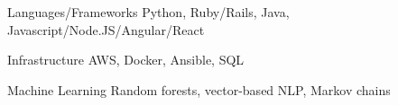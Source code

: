 

\begin{cvskills}
  \cvskill
    {Languages/Frameworks}
    {Python, Ruby/Rails, Java, Javascript/Node.JS/Angular/React}

  \cvskill
    {Infrastructure}
    {AWS, Docker, Ansible, SQL}

  \cvskill
    {Machine Learning}
    {Random forests, vector-based NLP, Markov chains}

\end{cvskills}
